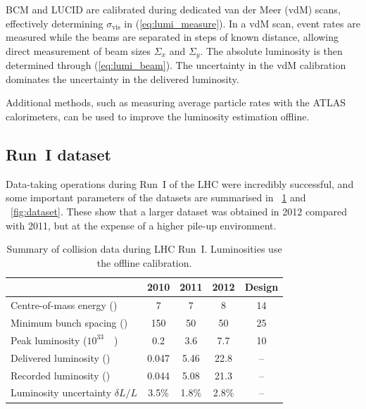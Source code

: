 \ac{BCM} and LUCID are calibrated during dedicated van der Meer (vdM) scans, effectively 
determining $\sigma_{\text{vis}}$ in (\ref{eq:lumi_measure}). In a vdM scan, event rates 
are measured while the beams are separated in steps of known distance, allowing direct 
measurement of beam sizes $\varSigma_x$ and $\varSigma_y$. The absolute luminosity is then 
determined through (\ref{eq:lumi_beam}). The uncertainty in the vdM calibration dominates 
the uncertainty in the delivered luminosity.

Additional methods, such as measuring average particle rates with the ATLAS calorimeters, 
can be used to improve the luminosity estimation offline.



\subsection{Run~I dataset}
\label{sec:dataset:dataset}

Data-taking operations during Run~I of the LHC were incredibly successful, and some 
important parameters of the \pp datasets are summarised in \Table~\ref{tab:dataset} and 
\Figure~\ref{fig:dataset}. These show that a larger dataset was obtained in 2012 compared 
with 2011, but at the expense of a higher pile-up environment.

\begin{table}[h]
	\begin{tabular}{l@{\hskip 0.3in}c@{\hskip 0.3in}c@{\hskip 0.3in}c@{\hskip 0.3in}c}
		\toprule
		& 2010 & 2011 & 2012 & Design \\
		\midrule
		Centre-of-mass energy (\TeV)         & 7 & 7 & 8 & 14 \\
		Minimum bunch spacing (\nano\second) & 150 & 50 & 50 & 25 \\
		Peak luminosity (\unit{$10^{33}$}{\lumiunits}) & 0.2 & 3.6 & 7.7 & 10 \\
		Delivered luminosity (\invfb)       & 0.047 & 5.46 & 22.8 & -- \\
		Recorded luminosity (\invfb)        & 0.044 & 5.08 & 21.3 & -- \\
		Luminosity uncertainty $\delta L/L$ & 3.5\% & 1.8\% & 2.8\% & -- \\
		\bottomrule
	\end{tabular}
	\caption{Summary of \pp collision data during \ac{LHC} Run~I. Luminosities use the 
	offline calibration.}
	\label{tab:dataset}
\end{table}


